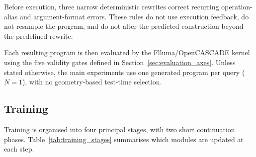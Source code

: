 \documentclass[preprint,12pt]{elsarticle}
\begin{document}
Before execution, three narrow deterministic rewrites correct recurring
operation-alias and argument-format errors. These rules do not use execution
feedback, do not resample the program, and do not alter the predicted
construction beyond the predefined rewrite.

Each resulting program is then evaluated by the Flluma/OpenCASCADE kernel
using the five validity gates defined in
Section~\ref{sec:evaluation_axes}. Unless stated otherwise, the main
experiments use one generated program per query ($N=1$), with no
geometry-based test-time selection.


\subsection{Training}
\label{sec:stage3b}

Training is organised into four principal stages, with two short continuation
phases. Table~\ref{tab:training_stages} summarises which modules are updated at
each step.
\end{document}

